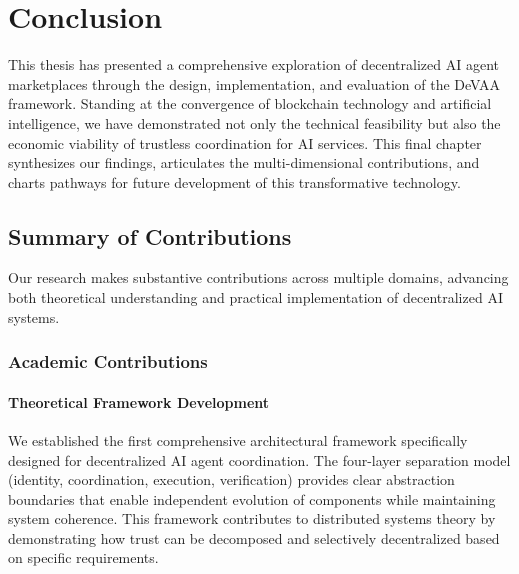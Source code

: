 \chapter{Conclusion}
\label{chap:conclusion}

This thesis has presented a comprehensive exploration of decentralized AI agent marketplaces through the design, implementation, and evaluation of the DeVAA framework. Standing at the convergence of blockchain technology and artificial intelligence, we have demonstrated not only the technical feasibility but also the economic viability of trustless coordination for AI services. This final chapter synthesizes our findings, articulates the multi-dimensional contributions, and charts pathways for future development of this transformative technology.

\section{Summary of Contributions}

Our research makes substantive contributions across multiple domains, advancing both theoretical understanding and practical implementation of decentralized AI systems.

\subsection{Academic Contributions}

\subsubsection{Theoretical Framework Development}
We established the first comprehensive architectural framework specifically designed for decentralized AI agent coordination. The four-layer separation model (identity, coordination, execution, verification) provides clear abstraction boundaries that enable independent evolution of components while maintaining system coherence. This framework contributes to distributed systems theory by demonstrating how trust can be decomposed and selectively decentralized based on specific requirements.

